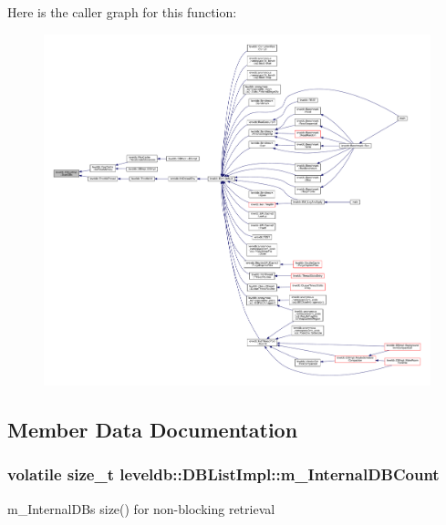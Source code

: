 Here is the caller graph for this function\+:
\nopagebreak
\begin{figure}[H]
\begin{center}
\leavevmode
\includegraphics[width=350pt]{classleveldb_1_1_d_b_list_impl_a0903e5cb81750c76b5d58835cf3c30ba_icgraph}
\end{center}
\end{figure}




\subsection{Member Data Documentation}
\hypertarget{classleveldb_1_1_d_b_list_impl_a4a3070e45b25fb23ee58ad4b8f034e85}{}
\subsubsection[{m\+\_\+\+Internal\+D\+B\+Count}]{\setlength{\rightskip}{0pt plus 5cm}volatile size\+\_\+t leveldb\+::\+D\+B\+List\+Impl\+::m\+\_\+\+Internal\+D\+B\+Count\hspace{0.3cm}{\ttfamily [protected]}}\label{classleveldb_1_1_d_b_list_impl_a4a3070e45b25fb23ee58ad4b8f034e85}


m\+\_\+\+Internal\+D\+Bs size() for non-\/blocking retrieval 

